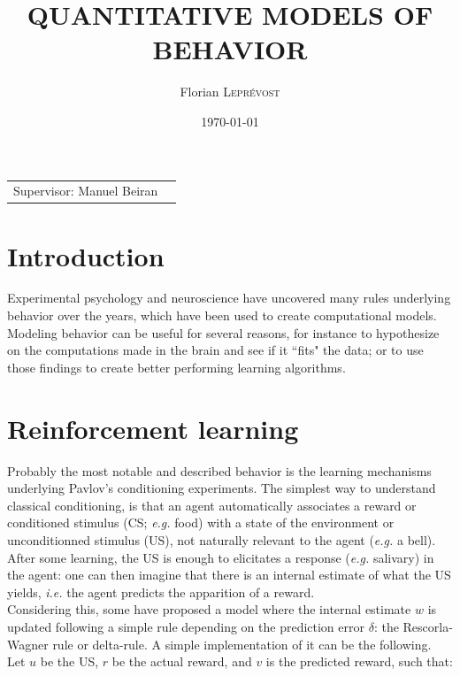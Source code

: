 \documentclass{article}
\title{QUANTITATIVE MODELS OF BEHAVIOR} %
\author{Florian \textsc{Leprévost}} %
\date{\today} %
\begin{document}
\maketitle %
\tableofcontents

\begin{center}
\begin{tabular}{l r}
Supervisor: Manuel Beiran %
\end{tabular}
\end{center}


\section{Introduction}

\indent\indent Experimental psychology and neuroscience have uncovered many rules underlying behavior over the years, which have been used to create computational models.  Modeling behavior can be useful for several reasons, for instance to hypothesize on the computations made in the brain and see if it ``fits" the data; or to use those findings to create better performing learning algorithms.

\section{Reinforcement learning}
\indent\indent Probably the most notable and described behavior is the learning mechanisms underlying Pavlov's conditioning experiments. The simplest way to understand classical conditioning, is that an agent automatically associates a reward or conditioned stimulus (CS; \textit{e.g.} food) with a state of the environment or unconditionned stimulus (US), not naturally relevant to the agent (\textit{e.g.} a bell). After some learning, the US is enough to elicitates a response (\textit{e.g.} salivary) in the agent: one can then imagine that there is an internal estimate of what the US yields, \textit{i.e.} the agent predicts the apparition of a reward.
\\
\indent Considering this, some have proposed a model where the internal estimate $w$ is updated following a simple rule depending on the prediction error $\delta$: the Rescorla-Wagner rule or delta-rule.
A simple implementation of it can be the following. Let $u$ be the US, $r$ be the actual reward, and $v$ is the predicted reward, such that:
\end{document}
